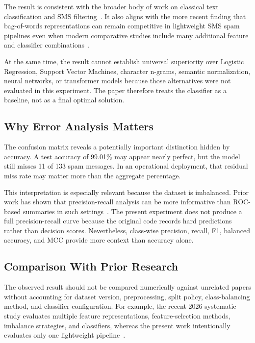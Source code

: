 \documentclass[conference]{IEEEtran}
\begin{document}
The result is consistent with the broader body of work on classical text classification and SMS filtering~\cite{sebastiani2002ml,mccallum1998nb,cormack2007feature,almeida2011sms}. It also aligns with the more recent finding that bag-of-words representations can remain competitive in lightweight SMS spam pipelines even when modern comparative studies include many additional feature and classifier combinations~\cite{senol2026pipeline}.

At the same time, the result cannot establish universal superiority over Logistic Regression, Support Vector Machines, character n-grams, semantic normalization, neural networks, or transformer models because those alternatives were not evaluated in this experiment. The paper therefore treats the classifier as a baseline, not as a final optimal solution.

\subsection{Why Error Analysis Matters}
The confusion matrix reveals a potentially important distinction hidden by accuracy. A test accuracy of 99.01\% may appear nearly perfect, but the model still misses 11 of 133 spam messages. In an operational deployment, that residual miss rate may matter more than the aggregate percentage.

This interpretation is especially relevant because the dataset is imbalanced. Prior work has shown that precision-recall analysis can be more informative than ROC-based summaries in such settings~\cite{davis2006pr,saito2015pr}. The present experiment does not produce a full precision-recall curve because the original code records hard predictions rather than decision scores. Nevertheless, class-wise precision, recall, F1, balanced accuracy, and MCC provide more context than accuracy alone.

\subsection{Comparison With Prior Research}
The observed result should not be compared numerically against unrelated papers without accounting for dataset version, preprocessing, split policy, class-balancing method, and classifier configuration. For example, the recent 2026 systematic study evaluates multiple feature representations, feature-selection methods, imbalance strategies, and classifiers, whereas the present work intentionally evaluates only one lightweight pipeline~\cite{senol2026pipeline}.
\end{document}
